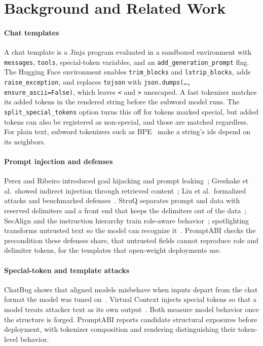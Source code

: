 \documentclass[10pt,conference]{IEEEtran}
\newcommand{\tool}{PromptABI\xspace}
\begin{document}
\section{Background and Related Work}
\label{sec:related}

\paragraph{Chat templates} A chat template is a Jinja program evaluated in a
sandboxed environment with \texttt{messages}, \texttt{tools}, special-token
variables, and an \texttt{add\_generation\_prompt} flag. The Hugging Face
environment enables \texttt{trim\_blocks} and \texttt{lstrip\_blocks}, adds
\texttt{raise\_exception}, and replaces \texttt{tojson} with
\texttt{json.dumps(\ldots, ensure\_ascii=False)}, which leaves \texttt{<} and
\texttt{>} unescaped. A fast tokenizer matches its added tokens in the rendered
string before the subword model runs. The \texttt{split\_special\_tokens}
option turns this off for tokens marked special, but added tokens can also be
registered as non-special, and those are matched regardless. For plain text,
subword tokenizers such as BPE~\cite{sennrich2016bpe} make a string's ids
depend on its neighbors.

\paragraph{Prompt injection and defenses} Perez and Ribeiro introduced goal
hijacking and prompt leaking~\cite{perez2022ignore}; Greshake et al.\ showed
indirect injection through retrieved content~\cite{greshake2023indirect}; Liu
et al.\ formalized attacks and benchmarked defenses~\cite{liu2024formalizing}.
StruQ separates prompt and data with reserved delimiters and a front end that
keeps the delimiters out of the data~\cite{chen2025struq}; SecAlign and the
instruction hierarchy train role-aware
behavior~\cite{chen2024secalign,wallace2024hierarchy}; spotlighting transforms
untrusted text so the model can recognize it~\cite{hines2024spotlighting}.
\tool checks the precondition these defenses share, that untrusted fields
cannot reproduce role and delimiter tokens, for the templates that open-weight
deployments use.

\paragraph{Special-token and template attacks} ChatBug shows that aligned
models misbehave when inputs depart from the chat format the model was tuned
on~\cite{jiang2025chatbug}. Virtual Context injects special tokens so that a
model treats attacker text as its own output~\cite{zhou2024virtual}. Both
measure model behavior once the structure is forged. \tool reports candidate structural exposures before deployment, with
tokenizer composition and rendering distinguishing their token-level behavior.
\end{document}
